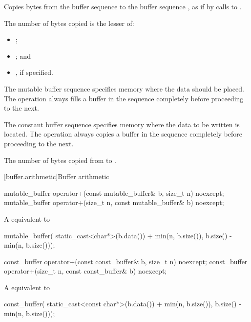 \begin{itemdescr}
\pnum
\effects Copies bytes from the buffer sequence  to the buffer sequence , as if by calls to .

\pnum
The number of bytes copied is the lesser of:
\begin{itemize}
\item
{};
\item
{}; and
\item
{}, if specified.
\end{itemize}

\pnum
The mutable buffer sequence  specifies memory where the data should be placed. The operation always fills a buffer in the sequence completely before proceeding to the next.

\pnum
The constant buffer sequence  specifies memory where the data to be written is located. The operation always copies a buffer in the sequence completely before proceeding to the next.

\pnum
\returns The number of bytes copied from  to .
\end{itemdescr}



[buffer.arithmetic]{Buffer arithmetic}

\begin{itemdecl}
mutable_buffer operator+(const mutable_buffer& b, size_t n) noexcept;
mutable_buffer operator+(size_t n, const mutable_buffer& b) noexcept;
\end{itemdecl}

\begin{itemdescr}
\pnum
\returns A  equivalent to 
\begin{codeblock}
mutable_buffer(
  static_cast<char*>(b.data()) + min(n, b.size()),
  b.size() - min(n, b.size()));
\end{codeblock}

\end{itemdescr}

\begin{itemdecl}
const_buffer operator+(const const_buffer& b, size_t n) noexcept;
const_buffer operator+(size_t n, const const_buffer& b) noexcept;
\end{itemdecl}

\begin{itemdescr}
\pnum
\returns A  equivalent to 
\begin{codeblock}
const_buffer(
  static_cast<const char*>(b.data()) + min(n, b.size()),
  b.size() - min(n, b.size()));
\end{codeblock}

\end{itemdescr}



